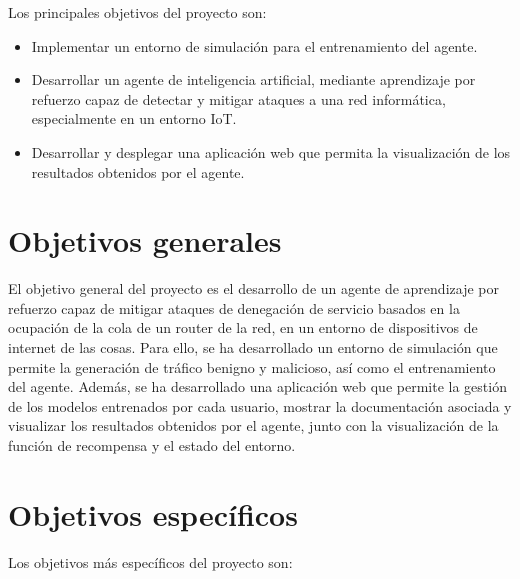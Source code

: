 
Los principales objetivos del proyecto son:
\begin{itemize}
    \item Implementar un entorno de simulación para el entrenamiento del agente.
    \item Desarrollar un agente de inteligencia artificial, mediante aprendizaje por refuerzo capaz de detectar y mitigar ataques a una red informática, especialmente en un entorno IoT.
    \item Desarrollar y desplegar una aplicación web que permita la visualización de los resultados obtenidos por el agente.
\end{itemize}

\section{Objetivos generales}
El objetivo general del proyecto es el desarrollo de un agente de aprendizaje por refuerzo capaz de mitigar ataques de denegación de servicio basados en la ocupación de la cola de un router de la red, en un entorno de dispositivos de internet de las cosas. Para ello, se ha desarrollado un entorno de simulación que permite la generación de tráfico benigno y malicioso, así como el entrenamiento del agente. Además, se ha desarrollado una aplicación web que permite la gestión de los modelos entrenados por cada usuario, mostrar la documentación asociada y visualizar los resultados obtenidos por el agente, junto con la visualización de la función de recompensa y el estado del entorno.

\section{Objetivos específicos}
Los objetivos más específicos del proyecto son:

